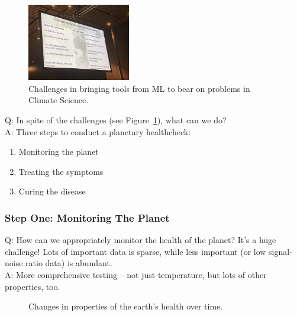 \begin{figure}[h!]
    \centering
    \includegraphics[width=0.4\textwidth]{images/cc_challenges.JPG}
    \caption{Challenges in bringing tools from ML to bear on problems in Climate Science.}
    \label{fig:cc_ml}
\end{figure}

Q: In spite of the challenges (see Figure~\ref{fig:cc_ml}), what can we do? \\

A: Three steps to conduct a planetary healthcheck:
\begin{enumerate}
    \item Monitoring the planet
    \item Treating the symptoms
    \item Curing the disease
\end{enumerate}

\subsubsection{Step One: Monitoring The Planet}

Q: How can we appropriately monitor the health of the planet? It's a huge challenge! Lots of important data is sparse, while less important (or low signal-noise ratio data) is abundant. \\

A: More comprehensive testing -- not just temperature, but lots of other properties, too.

\begin{figure}
    \centering
     \hspace{5mm}
    \caption{Changes in properties of the earth's health over time.}
    \label{fig:cc_data}
\end{figure}


